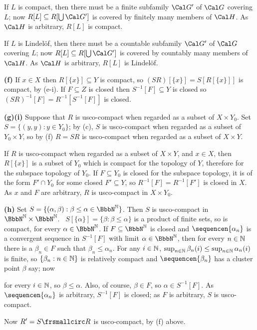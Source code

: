 {\medskip

 If $L$ is compact, then there must be a finite subfamily
$\Cal G'$ of $\Cal G$ covering $L$;  now $R[L]\subseteq R[\bigcup\Cal
G']$
is covered by finitely many members of $\Cal H$.   As $\Cal H$ is
arbitrary, $R[L]$ is compact.

\medskip

 If $L$ is Lindel\"of, then there must be a countable
subfamily $\Cal G'$ of $\Cal G$ covering $L$;  now
$R[L]\subseteq R[\bigcup\Cal G']$ is covered by countably many members
of $\Cal H$.   As $\Cal H$ is arbitrary, $R[L]$ is Lindel\"of.

\medskip

{\bf (f)} If $x\in X$ then $R[\{x\}]\subseteq Y$ is compact, so
$(SR)[\{x\}]=S[R[\{x\}]]$ is compact, by (e-i).   If $F\subseteq Z$ is
closed then $S^{-1}[F]\subseteq Y$ is closed so
$(SR)^{-1}[F]=R^{-1}[S^{-1}[F]]$ is closed.

\medskip

{\bf (g)(i)} Suppose that $R$ is usco-compact when regarded as a subset
of $X\times Y_0$.   Set $S=\{(y,y):y\in Y_0\}$;  by (c), $S$ is
usco-compact when regarded as a subset of $Y_0\times Y$, so by (f)
$R=SR$ is usco-compact when regarded as a subset of $X\times Y$.

\medskip

 If $R$ is usco-compact when regarded as a subset of
$X\times Y$, and $x\in X$, then $R[\{x\}]$ is a subset of $Y_0$ which is
compact for the topology of $Y$, therefore for the subspace topology of
$Y_0$.   If $F\subseteq Y_0$ is closed for the subspace topology, it is
of the form $F'\cap Y_0$ for some closed $F'\subseteq Y$,
so $R^{-1}[F]=R^{-1}[F']$ is closed in $X$.   As $x$ and $F$ are
arbitrary, $R$ is usco-compact in $X\times Y_0$.

\medskip

{\bf (h)} Set
$S=\{(\alpha,\beta):\beta\le\alpha\in\NN\}$.   Then $S$ is usco-compact in
$\NN\times\NN$.   \Prf\ 
$S[\{\alpha\}]=\{\beta:\beta\le\alpha\}$ is a product of finite sets, so is
compact, for every $\alpha\in\NN$.
If $F\subseteq\NN$ is closed and $\sequencen{\alpha_n}$ is a convergent
sequence in $S^{-1}[F]$ with limit $\alpha\in\NN$, 
then for every $n\in\Bbb N$ there is a
$\beta_n\in F$ such that $\beta_n\le\alpha_n$.   For any $i\in\Bbb N$,
$\sup_{n\in\Bbb N}\beta_n(i)\le\sup_{n\in\Bbb N}\alpha_n(i)$ is finite, so
$\{\beta_n:n\in\Bbb N\}$ is relatively compact and $\sequencen{\beta_n}$
has a cluster point $\beta$ say;  now


\noindent for every $i\in\Bbb N$, so $\beta\le\alpha$.   Also, of course,
$\beta\in F$, so $\alpha\in S^{-1}[F]$.   As $\sequencen{\alpha_n}$ is
arbitrary, $S^{-1}[F]$ is closed;  as $F$ is arbitrary, $S$ is
usco-compact.\ \Qed

Now $R'=S\frsmallcirc R$ is usco-compact, by (f) above.
}%

